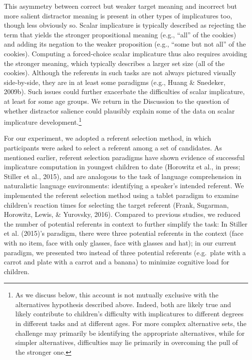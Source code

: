 \documentclass[man]{apa6}
\theoremstyle{definition}
\theoremstyle{definition}
\theoremstyle{definition}
\theoremstyle{remark}
\begin{document}
This asymmetry between correct but weaker target meaning and incorrect
but more salient distractor meaning is present in other types of
implicatures too, though less obviously so. Scalar implicature is
typically described as rejecting the term that yields the stronger
propositional meaning (e.g., \enquote{all} of the cookies) and adding
its negation to the weaker proposition (e.g., \enquote{some but not all}
of the cookies). Computing a forced-choice scalar implicature thus also
requires avoiding the stronger meaning, which typically describes a
larger set size (all of the cookies). Although the referents in such
tasks are not always pictured visually side-by-side, they are in at
least some paradigms (e.g., Huang \& Snedeker, 2009b). Such issues could
further exacerbate the difficulties of scalar implicature, at least for
some age groups. We return in the Discussion to the question of whether
distractor salience could plausibly explain some of the data on scalar
implicature development.\footnote{As we discuss below, this account is
  not mutually exclusive with the alternatives hypothesis described
  above. Indeed, both are likely true and likely contribute to
  children's difficulty with implicatures to different degrees in
  different tasks and at different ages. For more complex alternative
  sets, the challenge may primarily be identifying the appropriate
  alternatives, while for simpler alternatives, difficulties may lie
  primarily in overcoming the pull of the stronger one.}

For our experiment, we adopted a referent selection method, in which
participants were asked to select a referent among a set of candidates.
As mentioned earlier, referent selection paradigms have shown evidence
of successful implicature computation in youngest children to date
(Horowitz et al., in press; Stiller et al., 2015), and are analogous to
the task of language comprehension in naturalistic language
environments: identifying a speaker's intended referent. We implemented
the referent selection method using a tablet paradigm to examine
children's reaction times for selecting the target referent (Frank,
Sugarman, Horowitz, Lewis, \& Yurovsky, 2016). Compared to previous
studies, we reduced the number of potential referents in context to
further simplify the task: In Stiller et al. (2015)'s paradigm, there
were three potential referents in the context (face with no item, face
with only glasses, face with glasses and hat); in our current paradigm,
we presented two instead of three potential referents (e.g.~plate with a
carrot and plate with a carrot and a banana) to minimize cognitive load
for children.
\end{document}
